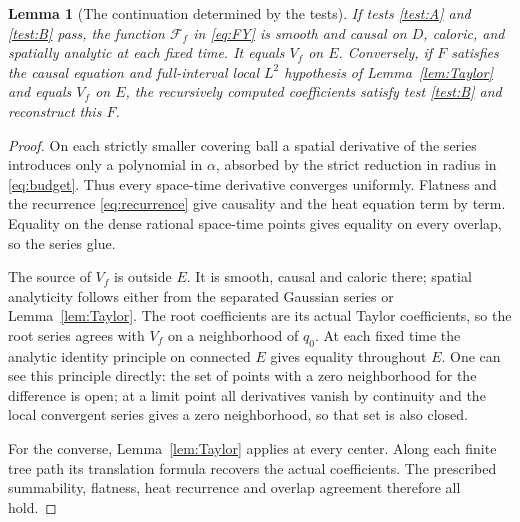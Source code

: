 \documentclass[11pt]{article}
\newtheorem{lemma}[theorem]{Lemma}
\theoremstyle{remark}
\newcommand{\calF}{\mathcal F}
\begin{document}
\begin{lemma}[The continuation determined by the tests]\label{lem:gluing}
If tests \ref{test:A} and \ref{test:B} pass, the function $\calF_f$
in \eqref{eq:FY} is smooth and causal on $D$, caloric, and spatially
analytic at each fixed time. It equals $V_f$ on $E$.
Conversely, if $F$ satisfies the causal equation and full-interval local
$L^2$ hypothesis of Lemma~\ref{lem:Taylor} and equals $V_f$ on $E$,
the recursively computed coefficients satisfy test \ref{test:B}
and reconstruct this $F$.
\end{lemma}
\begin{proof}
On each strictly smaller covering ball a spatial derivative of the series
introduces only a polynomial in $\alpha$, absorbed by the strict reduction
in radius in \eqref{eq:budget}.
Thus every space-time derivative converges uniformly.
Flatness and the recurrence \eqref{eq:recurrence} give causality and the
heat equation term by term.
Equality on the dense rational space-time points gives equality on
every overlap, so the series glue.

The source of $V_f$ is outside $E$.
It is smooth, causal and caloric there; spatial analyticity follows either
from the separated Gaussian series or Lemma~\ref{lem:Taylor}.
The root coefficients are its actual Taylor coefficients, so the
root series agrees with $V_f$ on a neighborhood of $q_0$.
At each fixed time the analytic identity principle on connected $E$
gives equality throughout $E$.
One can see this principle directly: the set of points with a zero
neighborhood for the difference is open; at a limit point all derivatives
vanish by continuity and the local convergent series gives a zero
neighborhood, so that set is also closed.

For the converse, Lemma~\ref{lem:Taylor} applies at every center.
Along each finite tree path its translation formula recovers the actual
coefficients. The prescribed summability, flatness, heat recurrence and
overlap agreement therefore all hold.
\end{proof}
\end{document}

